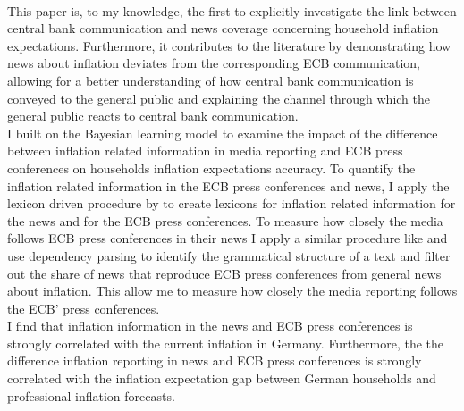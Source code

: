 \documentclass[review]{elsarticle}
\begin{document}
%
%
%
%
\\
This paper is, to my knowledge, the first to explicitly investigate the link between central bank communication and news coverage concerning household inflation expectations. Furthermore, it contributes to the literature by demonstrating how news about inflation deviates from the corresponding ECB communication, allowing for a better understanding of how central bank communication is conveyed to the general public and explaining the channel through which the general public reacts to central bank communication.
%
%
\\
I built on the Bayesian learning model \citep{LamlaLein2014} to examine the impact of the difference between inflation related information in media reporting and ECB press conferences on households inflation expectations accuracy. To quantify the inflation related information in the ECB press conferences and news, I apply the lexicon driven procedure by \cite{PicaultRenault2017} to create lexicons for inflation related information for the news and for the ECB press conferences. To measure how closely the media follows ECB press conferences in their news I apply a similar procedure like\cite{Picaultetal2022} and use dependency parsing to identify the grammatical structure of a text and filter out the share of news that reproduce ECB press conferences from general news about inflation. This allow me to measure how closely the media reporting follows the ECB' press conferences.
%
%
\\
I find that inflation information in the news and ECB press conferences is strongly correlated with the current inflation in Germany. Furthermore, the the difference inflation reporting in news and ECB press conferences is strongly correlated with the inflation expectation gap between German households and professional inflation forecasts. 
\end{document}
